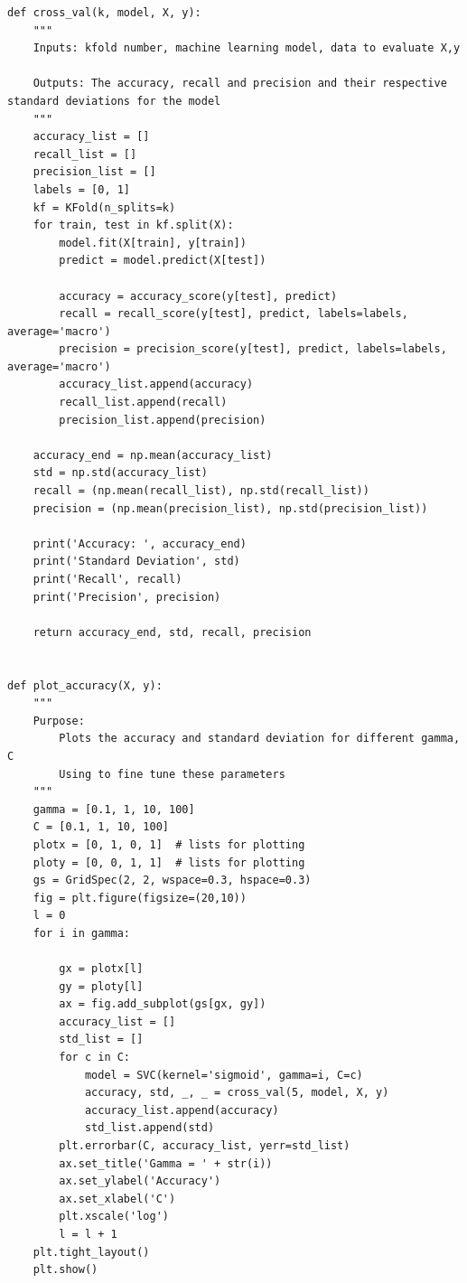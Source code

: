 \documentclass[11pt]{article} %
\begin{document}
\begin{verbatim}
def cross_val(k, model, X, y):
    """
    Inputs: kfold number, machine learning model, data to evaluate X,y

    Outputs: The accuracy, recall and precision and their respective standard deviations for the model
    """
    accuracy_list = []
    recall_list = []
    precision_list = []
    labels = [0, 1]
    kf = KFold(n_splits=k)
    for train, test in kf.split(X):
        model.fit(X[train], y[train])
        predict = model.predict(X[test])

        accuracy = accuracy_score(y[test], predict)
        recall = recall_score(y[test], predict, labels=labels, average='macro')
        precision = precision_score(y[test], predict, labels=labels, average='macro')
        accuracy_list.append(accuracy)
        recall_list.append(recall)
        precision_list.append(precision)

    accuracy_end = np.mean(accuracy_list)
    std = np.std(accuracy_list)
    recall = (np.mean(recall_list), np.std(recall_list))
    precision = (np.mean(precision_list), np.std(precision_list))

    print('Accuracy: ', accuracy_end)
    print('Standard Deviation', std)
    print('Recall', recall)
    print('Precision', precision)

    return accuracy_end, std, recall, precision


def plot_accuracy(X, y):
    """
    Purpose:
        Plots the accuracy and standard deviation for different gamma, C
        Using to fine tune these parameters
    """
    gamma = [0.1, 1, 10, 100]
    C = [0.1, 1, 10, 100]
    plotx = [0, 1, 0, 1]  # lists for plotting
    ploty = [0, 0, 1, 1]  # lists for plotting
    gs = GridSpec(2, 2, wspace=0.3, hspace=0.3)
    fig = plt.figure(figsize=(20,10))
    l = 0
    for i in gamma:

        gx = plotx[l]
        gy = ploty[l]
        ax = fig.add_subplot(gs[gx, gy])
        accuracy_list = []
        std_list = []
        for c in C:
            model = SVC(kernel='sigmoid', gamma=i, C=c)
            accuracy, std, _, _ = cross_val(5, model, X, y)
            accuracy_list.append(accuracy)
            std_list.append(std)
        plt.errorbar(C, accuracy_list, yerr=std_list)
        ax.set_title('Gamma = ' + str(i))
        ax.set_ylabel('Accuracy')
        ax.set_xlabel('C')
        plt.xscale('log')
        l = l + 1
    plt.tight_layout()
    plt.show()
\end{verbatim}
\end{document}
